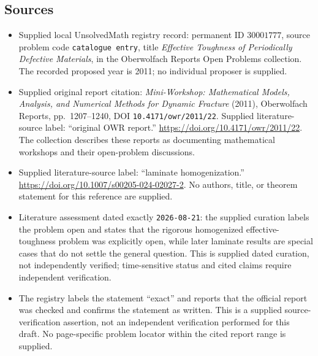 \documentclass[11pt]{article}
\begin{document}
\subsection{Sources}
\begin{itemize}
\item Supplied local UnsolvedMath registry record: permanent ID \(30001777\), source problem code \texttt{catalogue entry}, title \emph{Effective Toughness of Periodically Defective Materials}, in the Oberwolfach Reports Open Problems collection. The recorded proposed year is 2011; no individual proposer is supplied.
\item Supplied original report citation: \emph{Mini-Workshop: Mathematical Models, Analysis, and Numerical Methods for Dynamic Fracture} (2011), Oberwolfach Reports, pp.\ 1207--1240, DOI \texttt{10.4171/owr/2011/22}. Supplied literature-source label: ``original OWR report.'' \url{https://doi.org/10.4171/owr/2011/22}. The collection describes these reports as documenting mathematical workshops and their open-problem discussions.
\item Supplied literature-source label: ``laminate homogenization.'' \url{https://doi.org/10.1007/s00205-024-02027-2}. No authors, title, or theorem statement for this reference are supplied.
\item Literature assessment dated exactly \texttt{2026-08-21}: the supplied curation labels the problem open and states that the rigorous homogenized effective-toughness problem was explicitly open, while later laminate results are special cases that do not settle the general question. This is supplied dated curation, not independently verified; time-sensitive status and cited claims require independent verification.
\item The registry labels the statement ``exact'' and reports that the official report was checked and confirms the statement as written. This is a supplied source-verification assertion, not an independent verification performed for this draft. No page-specific problem locator within the cited report range is supplied.
\end{itemize}
\end{document}
